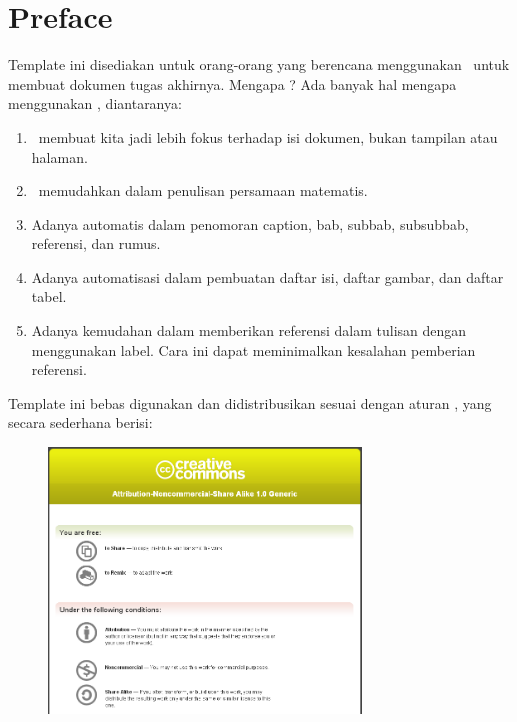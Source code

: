 \chapter*{Preface}
Template ini disediakan untuk orang-orang yang berencana menggunakan 
\latex~untuk membuat dokumen tugas akhirnya. 
Mengapa \latex? 
Ada banyak hal mengapa menggunakan \latex, diantaranya:

\begin{enumerate}
	\item \latex~membuat kita jadi lebih fokus terhadap isi dokumen, bukan 
		tampilan atau halaman. 
	\item \latex~memudahkan dalam penulisan persamaan matematis. 
	\item Adanya automatis dalam penomoran caption, bab, subbab, subsubbab, 
		referensi, dan rumus. 
	\item Adanya automatisasi dalam pembuatan daftar isi, daftar gambar, dan
		daftar tabel. 
	\item Adanya kemudahan dalam memberikan referensi dalam tulisan dengan 
		menggunakan label. Cara ini dapat meminimalkan kesalahan pemberian 
		referensi. 
\end{enumerate}

Template ini bebas digunakan dan 
didistribusikan sesuai dengan aturan \license, yang secara sederhana berisi: 

\begin{figure}
	\centering
	\includegraphics[width=0.74\textwidth]
		{assets/pics/creative_common.png}
	\caption{\license}
	\label{fig:lisensi}
\end{figure}

